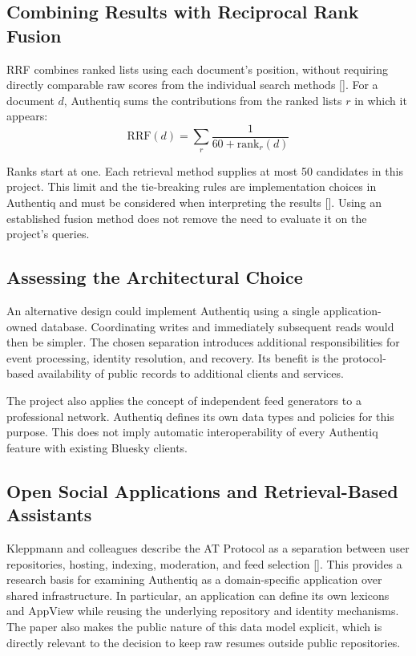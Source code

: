 \documentclass[11pt,a4paper]{article}
\newcommand{\reflink}[1]{\hyperlink{ref:#1}{#1}}
\newcommand{\refsep}{}
\newcommand{\refs}[1]{\begingroup
  \gdef\refsep{}%
  \renewcommand*{\do}[1]{\refsep\reflink{##1}\gdef\refsep{, }}%
  [\docsvlist{#1}]\endgroup}
\begin{document}
\subsection{Combining Results with Reciprocal Rank Fusion}

RRF combines ranked lists using each document's position, without requiring directly comparable raw scores from the individual search methods \refs{L4}. For a document $d$, Authentiq sums the contributions from the ranked lists $r$ in which it appears:
\begin{equation}
  \mathrm{RRF}(d) = \sum_{r} \frac{1}{60 + \mathrm{rank}_r(d)}
\end{equation}

Ranks start at one. Each retrieval method supplies at most 50 candidates in this project. This limit and the tie-breaking rules are implementation choices in Authentiq and must be considered when interpreting the results \refs{P6}. Using an established fusion method does not remove the need to evaluate it on the project's queries.

\subsection{Assessing the Architectural Choice}

An alternative design could implement Authentiq using a single application-owned database. Coordinating writes and immediately subsequent reads would then be simpler. The chosen separation introduces additional responsibilities for event processing, identity resolution, and recovery. Its benefit is the protocol-based availability of public records to additional clients and services.

The project also applies the concept of independent feed generators to a professional network. Authentiq defines its own data types and policies for this purpose. This does not imply automatic interoperability of every Authentiq feature with existing Bluesky clients.

\subsection{Open Social Applications and Retrieval-Based Assistants}

Kleppmann and colleagues describe the AT Protocol as a separation between user repositories, hosting, indexing, moderation, and feed selection \refs{L5}. This provides a research basis for examining Authentiq as a domain-specific application over shared infrastructure. In particular, an application can define its own lexicons and AppView while reusing the underlying repository and identity mechanisms. The paper also makes the public nature of this data model explicit, which is directly relevant to the decision to keep raw resumes outside public repositories.
\end{document}
